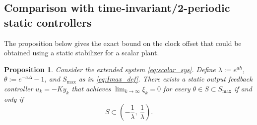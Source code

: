\documentclass[letterpaper, 12pt, draftcls, onecolumn]{ieeeconf}
\newtheorem{proposition}[theorem]{Proposition}
\begin{document}
\subsection{Comparison with time-invariant/2-periodic 
	static controllers}
The proposition below gives the exact bound
on the clock offset that could be obtained using a static
stabilizer for a scalar plant.
\begin{proposition}
	\label{prop:static}
	{\it
		Consider the extended system \eqref{eq:scalar_sys}.
		Define $\lambda := e^{ah}$, $\theta := e^{-a\Delta} - 1$, and
		$S_{\max}$ as in \eqref{eq:Imax_def}.
		There exists  a static output feedback controller
		$u_k = -Ky_k$ that achieves $\lim_{k \to \infty}\xi_k = 0$
		for every $\theta \in S \subset S_{\max}$ 
		if and only if
		\begin{equation}
		\label{eq:static_bound}
		S \subset \left(-\frac{1}{\lambda},~\frac{1}{\lambda}\right).
		\end{equation}
	}
\end{proposition}
\end{document}
